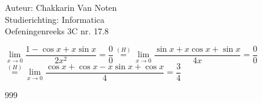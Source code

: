 \documentclass[a4paper]{article}
\begin{document}
  
\noindent \large Auteur: Chakkarin Van Noten \\
\noindent \large Studierichting: Informatica\\
\noindent \large Oefeningenreeks 3C nr. 17.8\\

\medskip

\normalsize

$\lim\limits_{x \to 0} \dfrac{1-\cos x+x\sin x}{2x^2} = \dfrac{0}{0} \stackrel{(H)}{=} \lim\limits_{x \to 0} \dfrac{\sin x+x\cos x+\sin x}{4x} = \dfrac{0}{0}$\\

$\stackrel{(H)}{=} \lim\limits_{x \to 0} \dfrac{\cos x+\cos x-x\sin x+\cos x}{4} = \dfrac{3}{4}$

\begin{thebibliography}{999}
\end{thebibliography}
\end{document}
